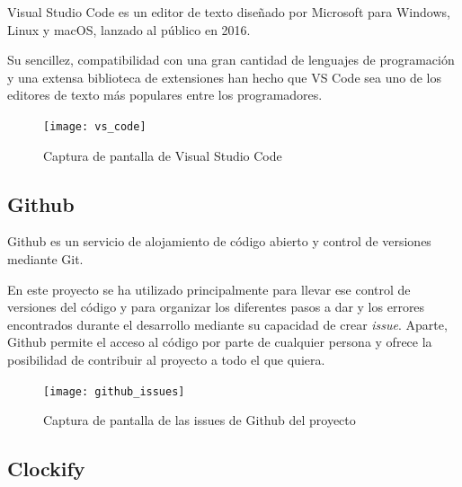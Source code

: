             Visual Studio Code es un editor de texto diseñado por Microsoft para Windows, Linux y macOS, lanzado al
            público en 2016.

            Su sencillez, compatibilidad con una gran cantidad de lenguajes de programación y una extensa biblioteca de
            extensiones han hecho que VS Code sea uno de los editores de texto más populares entre los programadores.
            \cite{wikipedia_vs_code}

            \begin{figure}[ht]
                \centering
                \texttt{[image: vs\_code]}
                \caption{Captura de pantalla de Visual Studio Code \label{fig:VisualStudioCode}}
            \end{figure}

            \newpage


        \subsection{Github} %
        \label{sub:Github}

            Github es un servicio de alojamiento de código abierto y control de versiones mediante Git.

            En este proyecto se ha utilizado principalmente para llevar ese control de versiones del código y para
            organizar los diferentes pasos a dar y los errores encontrados durante el desarrollo mediante su capacidad
            de crear \textit{issue}. Aparte, Github permite el acceso al código por parte de cualquier persona y ofrece
            la posibilidad de contribuir al proyecto a todo el que quiera.

            \begin{figure}[ht]
                \centering
                \texttt{[image: github\_issues]}
                \caption{Captura de pantalla de las issues de Github del proyecto \label{fig:GithubIssues}}
            \end{figure}

            \newpage


        \subsection{Clockify} %
        \label{sub:Clockify}

